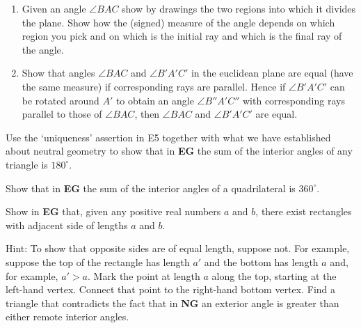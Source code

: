 \documentclass{ximera}
\begin{document}
\begin{question}\hfil
\begin{enumerate}
\item Given an angle $\angle BAC$ show by drawings the two regions
  into which it divides the plane. Show how the (signed) measure of
  the angle depends on which region you pick and on which is the
  initial ray and which is the final ray of the angle.
\item Show that angles $\angle BAC$ and $\angle B'A'C'$ in the
  euclidean plane are equal (have the same measure) if corresponding
  rays are parallel. Hence if $\angle B'A'C'$ can be rotated around
  $A'$ to obtain an angle $\angle B''A'C''$ with corresponding rays
  parallel to those of $\angle BAC$, then $\angle BAC$ and $\angle
  B'A'C'$ are equal.
\end{enumerate}
\begin{solution}
\end{solution}
\end{question}

\begin{question}
Use the `uniqueness' assertion in E5 together with what we have
established about neutral geometry to show that in \textbf{EG} the sum
of the interior angles of any triangle is $180^\circ$.
\begin{solution}
\end{solution}
\end{question}





\begin{question}
Show that in \textbf{EG} the sum of the interior angles of a
quadrilateral is $360^\circ$.
\begin{solution}
\end{solution}
\end{question}

\begin{question}\label{112} 
Show in \textbf{EG} that, given any positive real numbers $a$ and $b$,
there exist rectangles with adjacent side of lengths $a$ and $b$.

Hint: To show that opposite sides are of equal length, suppose
not. For example, suppose the top of the rectangle has length
$a'$ and the bottom has length $a$ and, for example,
$a'>a$. Mark the point at length $a$ along the top, starting
at the left-hand vertex. Connect that point to the right-hand bottom
vertex. Find a triangle that contradicts the fact that in \textbf{NG}
an exterior angle is greater than either remote interior angles.
\end{question}
\end{document}
